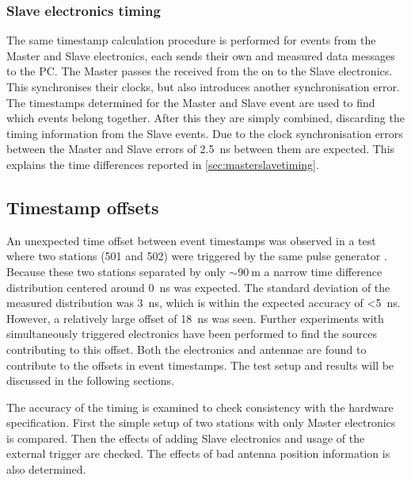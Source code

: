 \subsubsection{Slave electronics timing}

The same timestamp calculation procedure is performed for events from the Master and Slave electronics, each sends their own \osm and measured data messages to the PC. The Master passes the received \pps from the \gps on to the Slave electronics. This synchronises their clocks, but also introduces another synchronisation error. The timestamps determined for the Master and Slave event are used to find which events belong together. After this they are simply combined, discarding the timing information from the Slave events. Due to the clock synchronisation errors between the Master and Slave errors of \SI{2.5}{\ns} between them are expected. This explains the time differences reported in \cref{sec:masterslavetiming}.


\subsection{Timestamp offsets}
\label{sec:gps_accuracy}

An unexpected time offset between event timestamps was observed in a test where two \hisparc stations (501 and 502) were triggered by the same pulse generator \cite[p. 47]{fokkema2012hisparc}. Because these two stations separated by only $\sim\SI{90}{\meter}$ a narrow time difference distribution centered around \SI{0}{\ns} was expected. The standard deviation of the measured distribution was \SI{3}{\ns}, which is within the expected \gps accuracy of \SI{<5}{\ns}. However, a relatively large offset of \SI{18}{\ns} was seen. Further experiments with simultaneously triggered \hisparc electronics have been performed to find the sources contributing to this offset. Both the \hisparc electronics and \gps antennae are found to contribute to the offsets in event timestamps. The test setup and results will be discussed in the following sections.

The accuracy of the timing is examined to check consistency with the hardware specification. First the simple setup of two stations with only Master electronics is compared. Then the effects of adding Slave electronics and usage of the external trigger are checked. The effects of bad antenna position information is also determined.


